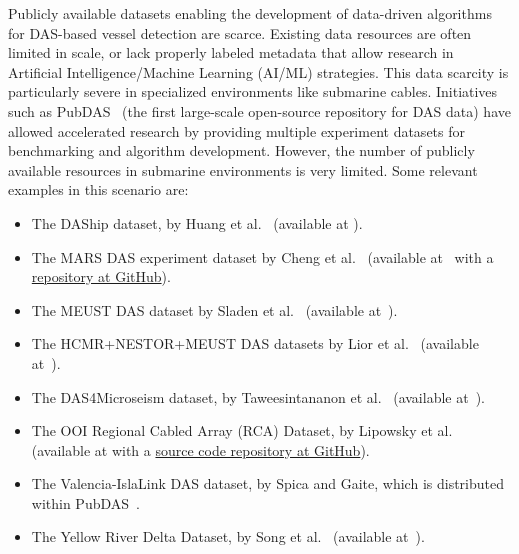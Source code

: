 \documentclass[11pt]{article}
\begin{document}
Publicly available datasets enabling the development of data-driven algorithms for DAS-based vessel detection are scarce. Existing data resources are often limited in scale, or lack properly labeled metadata that allow research in Artificial Intelligence/Machine Learning (AI/ML) strategies. This data scarcity is particularly severe in specialized environments like submarine cables. Initiatives such as PubDAS~\cite{pubDAS2023} (the first large-scale open-source repository for DAS data) have allowed accelerated research by providing multiple experiment datasets for benchmarking and algorithm development. However, the number of publicly available resources in submarine environments is very limited. Some relevant examples in this scenario are:
\begin{itemize}
  \item The DAShip dataset, by Huang et al.~\cite{Huang2025DAShip} (available at \cite{DAShip2025}).
  \item The MARS DAS experiment dataset by Cheng et al.~\cite{cheng2021utilizing} (available at~\cite{cheng2020mbari_das_data} with a \href{https://github.com/njlindsey/Photonic-seismology-in-Monterey-Bay-Dark-fiber1DAS-illuminates-offshore-faults-and-coastal-ocean}{repository at GitHub}).
  \item The MEUST DAS dataset by Sladen et al.~\cite{sladen2019distributed} (available at~\cite{sladen2019meust_km3net_das}).
  \item The HCMR+NESTOR+MEUST DAS datasets by Lior et al.~\cite{lior2021detection} (available at~\cite{lior2021detection_dataset}).
  \item The DAS4Microseism dataset, by Taweesintananon et al.~\cite{Taweesintananon2023} (available at~\cite{VPRD2H_2022}).
  \item The OOI Regional Cabled Array (RCA) Dataset, by Lipowsky et al.~\cite{shi2025multiplexed} (available at \cite{lipovsky2024rapid_das_ooi} with a \href{https://github.com/uwfiberlab/OOI_DAS_2024}{source code repository at GitHub}).
  \item The Valencia-IslaLink DAS dataset, by Spica and Gaite, which is distributed within PubDAS~\cite{pubDAS2023}.
  \item The Yellow River Delta Dataset, by Song et al.~\cite{song2024near} (available at~\cite{song_2024_dataset}).
\end{itemize}
\end{document}
